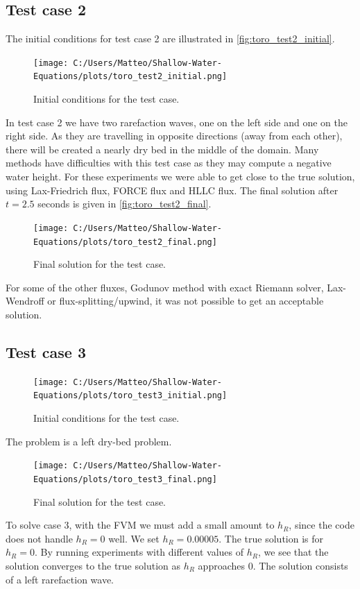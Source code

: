 \subsection*{Test case 2}
The initial conditions for test case 2 are illustrated in \autoref{fig:toro_test2_initial}.
\begin{figure}[H]
    \centering
    \texttt{[image: C:/Users/Matteo/Shallow-Water-Equations/plots/toro\_test2\_initial.png]}
    \caption{Initial conditions for the test case.}\label{fig:toro_test2_initial}
\end{figure}
In test case 2 we have two rarefaction waves, one on the left side and one on the right side.
As they are travelling in opposite directions (away from each other), there will be created a nearly dry bed in the middle of the domain.
Many methods have difficulties with this test case as they may compute a negative water height.
For these experiments we were able to get close to the true solution, using Lax-Friedrich flux, FORCE flux and HLLC flux.
The final solution after $t=2.5$ seconds is given in \autoref{fig:toro_test2_final}.

\begin{figure}[H]
    \centering
    \texttt{[image: C:/Users/Matteo/Shallow-Water-Equations/plots/toro\_test2\_final.png]}
    \caption{Final solution for the test case.}\label{fig:toro_test2_final}
\end{figure}


For some of the other fluxes, Godunov method with exact Riemann solver, Lax-Wendroff or flux-splitting/upwind, it was not possible to get an acceptable solution.

\subsection*{Test case 3}

\begin{figure}[H]
    \centering
    \texttt{[image: C:/Users/Matteo/Shallow-Water-Equations/plots/toro\_test3\_initial.png]}
    \caption{Initial conditions for the test case.}\label{fig:toro_test3_initial}
\end{figure}
The problem is a left dry-bed problem.


\begin{figure}[H]
    \centering
    \texttt{[image: C:/Users/Matteo/Shallow-Water-Equations/plots/toro\_test3\_final.png]}
    \caption{Final solution for the test case.}\label{fig:toro_test3_final}
\end{figure}
To solve case 3, with the FVM we must add a small amount to $h_R$, since the code does not handle $h_R = 0$ well.
We set $h_R = 0.00005$.
The true solution is for $h_R = 0$.
By running experiments with different values of $h_R$, we see that the solution converges to the true solution as $h_R$ approaches 0.
The solution consists of a left rarefaction wave.

